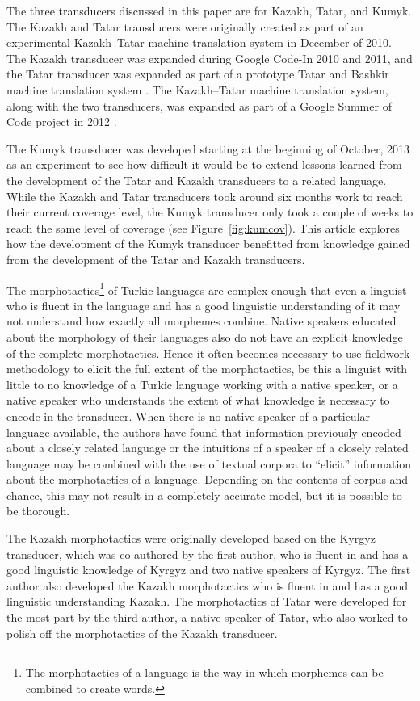 \documentclass[a4paper,11pt,twocolumn]{article}
\begin{document}
The three transducers discussed in this paper are for Kazakh, Tatar, and Kumyk.  The Kazakh and Tatar transducers were originally created as part of an experimental Kazakh--Tatar machine translation system in December of 2010.  The Kazakh transducer was expanded during Google Code-In 2010 and 2011, and the Tatar transducer was expanded as part of a prototype Tatar and Bashkir machine translation system \citep{tyerswashingtonsalimzyanbattalov12}.  The Kazakh--Tatar machine translation system, along with the two transducers, was expanded as part of a Google Summer of Code project in 2012 \citep{salimzyanov2013}.

The Kumyk transducer was developed starting at the beginning of October, 2013 as an experiment to see how difficult it would be to extend lessons learned from the development of the Tatar and Kazakh transducers to a related language.  While the Kazakh and Tatar transducers took around six months work to reach their current coverage level, the Kumyk transducer only took a couple of weeks to reach the same level of coverage (see Figure~\ref{fig:kumcov}).  This article explores how the development of the Kumyk transducer benefitted from knowledge gained from the development of the Tatar and Kazakh transducers.

The morphotactics\footnote{The morphotactics of a language is the way in which morphemes can be combined to create words.} of Turkic languages are complex enough that even a linguist who is fluent in the language and has a good linguistic understanding of it may not understand how exactly all morphemes combine.  Native speakers educated about the morphology of their languages also do not have an explicit knowledge of the complete morphotactics.  Hence it often becomes necessary to use fieldwork methodology to elicit the full extent of the morphotactics, be this a linguist with little to no knowledge of a Turkic language working with a native speaker, or a native speaker who understands the extent of what knowledge is necessary to encode in the transducer.  When there is no native speaker of a particular language available, the authors have found that information previously encoded about a closely related language or the intuitions of a speaker of a closely related language may be combined with the use of textual corpora to ``elicit'' information about the morphotactics of a language.  Depending on the contents of corpus and chance, this may not result in a completely accurate model, but it is possible to be thorough.

The Kazakh morphotactics were originally developed based on the Kyrgyz transducer, which was co-authored by the first author, who is fluent in and has a good linguistic knowledge of Kyrgyz and two native speakers of Kyrgyz. The first author also developed the Kazakh morphotactics who is fluent in and has a good linguistic understanding Kazakh.  The morphotactics of Tatar were developed for the most part by the third author, a native speaker of Tatar, who also worked to polish off the morphotactics of the Kazakh transducer.
\end{document}
